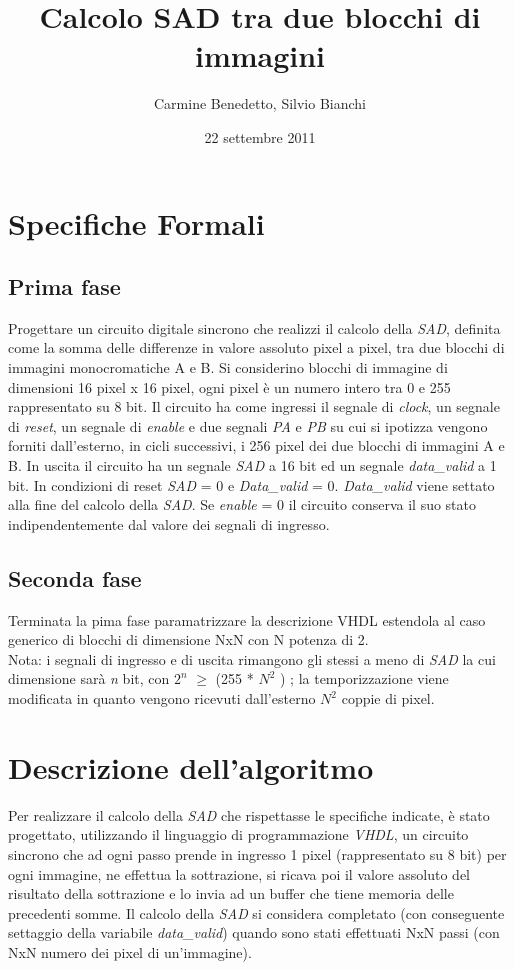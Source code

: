 \documentclass[12pt, a4paper]{article}
\title{Calcolo SAD tra due blocchi di immagini}
\author{Carmine Benedetto, Silvio Bianchi}
\date{22 settembre 2011}
\begin{document}
\maketitle
\newpage
\tableofcontents
\newpage 
\listoffigures
\newpage
\section{Specifiche Formali}
\subsection{Prima fase}
Progettare un circuito digitale sincrono che realizzi il calcolo della \textit{SAD}, definita come
la somma delle differenze in valore assoluto pixel a pixel, tra due blocchi di immagini
monocromatiche A e B. Si considerino blocchi di immagine di dimensioni 16 pixel x 16
pixel, ogni pixel è un numero intero tra 0 e 255 rappresentato su 8 bit. Il circuito ha come
ingressi il segnale di \textit{clock}, un segnale di \textit{reset}, un segnale di \textit{enable} e due segnali \textit{PA} e
 \textit{PB} su cui si ipotizza vengono forniti dall’esterno, in cicli successivi, i 256 pixel dei due
blocchi di immagini A e B. In uscita il circuito ha un segnale \textit{SAD} a 16 bit ed un segnale
\textit{data\_valid} a 1 bit. In condizioni di reset \textit{SAD} = 0 e \textit{Data\_valid} = 0. \textit{Data\_valid} viene settato
alla fine del calcolo della \textit{SAD}. Se \textit{enable} = 0 il circuito conserva il suo stato
indipendentemente dal valore dei segnali di ingresso.
\subsection{Seconda fase}
Terminata la pima fase paramatrizzare la descrizione VHDL estendola al caso generico
di blocchi di dimensione NxN con N potenza di 2.\\
Nota: i segnali di ingresso e di uscita rimangono gli stessi a meno di \textit{SAD} la cui dimensione sarà \textit{n} bit, con $2^n$ $\geq$ (255 * $N^2$ ) ; la temporizzazione viene modificata in quanto vengono ricevuti dall’esterno $N^2$ coppie di pixel.
\newpage
\section{Descrizione dell'algoritmo}
Per realizzare il calcolo della \textit{SAD} che rispettasse le specifiche indicate, è stato progettato, utilizzando il linguaggio di programmazione \textit{VHDL}, un circuito sincrono che ad ogni passo prende in ingresso 1 pixel (rappresentato su 8 bit) per ogni immagine, ne effettua la sottrazione, si ricava poi il valore assoluto del risultato della sottrazione e lo invia ad un buffer che tiene memoria delle precedenti somme. Il calcolo della \textit{SAD} si considera completato (con conseguente settaggio della variabile \textit{data\_valid}) quando sono stati effettuati NxN passi (con NxN numero dei pixel di un'immagine).
\newpage
\end{document}
